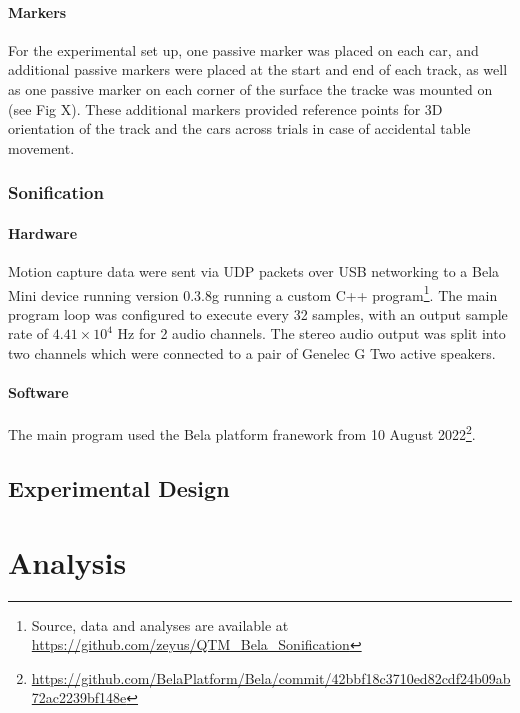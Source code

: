 \documentclass[10pt,a4paper,onecolumn]{article}
\let\oldparagraph\paragraph
\renewcommand{\paragraph}[1]{\oldparagraph{#1}\mbox{}}
\begin{document}
\hypertarget{markers}{%
\paragraph{Markers}\label{markers}}

For the experimental set up, one passive marker was placed on each car, and additional passive markers were placed at the start and end of each track, as well as one passive marker on each corner of the surface the tracke was mounted on (see Fig X).
These additional markers provided reference points for 3D orientation of the track and the cars across trials in case of accidental table movement.

\hypertarget{sonification-1}{%
\subsubsection{Sonification}\label{sonification-1}}

\hypertarget{hardware}{%
\paragraph{Hardware}\label{hardware}}

Motion capture data were sent via UDP packets over USB networking to a Bela Mini device running version 0.3.8g running a custom C++ program\footnote{Source, data and analyses are available at \url{https://github.com/zeyus/QTM_Bela_Sonification}}. The main program loop
was configured to execute every 32 samples, with an output sample rate of \ensuremath{4.41\times 10^{4}} Hz for 2 audio channels. The stereo audio output was split into
two channels which were connected to a pair of Genelec G Two active speakers.

\hypertarget{software}{%
\paragraph{Software}\label{software}}

The main program used the Bela platform franework from 10 August 2022\footnote{\url{https://github.com/BelaPlatform/Bela/commit/42bbf18c3710ed82cdf24b09ab72ac2239bf148e}}.

\hypertarget{experimental-design}{%
\subsection{Experimental Design}\label{experimental-design}}

\hypertarget{analysis}{%
\section{Analysis}\label{analysis}}
\end{document}
